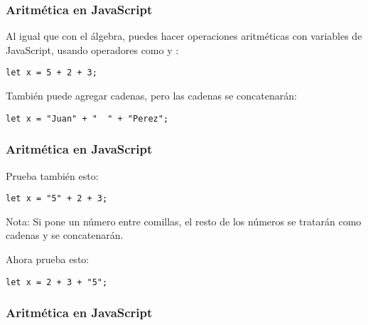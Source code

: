 \begin{frame}[fragile]
  \frametitle{Aritmética en JavaScript}

  Al igual que con el álgebra, puedes hacer operaciones
  aritméticas con variables de JavaScript,
  usando operadores como \atri{=} y \atri{+}:

  \vspace{\baselineskip}
  \begin{lstlisting}
let x = 5 + 2 + 3;
  \end{lstlisting}

  \vspace{\baselineskip}
  También puede agregar cadenas, pero las cadenas se concatenarán:
  \begin{lstlisting}
let x = "Juan" + "  " + "Perez";
  \end{lstlisting}
\end{frame}

\begin{frame}[fragile]
  \frametitle{Aritmética en JavaScript}

  Prueba también esto:
  \vspace{\baselineskip}
  \begin{lstlisting}
let x = "5" + 2 + 3;
  \end{lstlisting}

  \vspace{\baselineskip}
  \begin{alertblock}{Nota:}
    Si pone un número entre comillas, el resto de los números se
    tratarán como cadenas y se concatenarán.
  \end{alertblock}

  \vspace{\baselineskip}
  Ahora prueba esto:
  \begin{lstlisting}
let x = 2 + 3 + "5";
  \end{lstlisting}
\end{frame}

\begin{frame}[fragile]
  \frametitle{Aritmética en JavaScript}
  
\end{frame}

